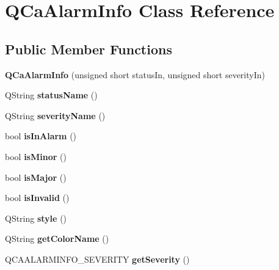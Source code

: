 \hypertarget{classQCaAlarmInfo}{
\section{QCaAlarmInfo Class Reference}
\label{classQCaAlarmInfo}
}
\subsection*{Public Member Functions}
\begin{DoxyCompactItemize}
\item 
\hypertarget{classQCaAlarmInfo_ae9661378ae726b443ddd0378819ec382}{
{\bfseries QCaAlarmInfo} (unsigned short statusIn, unsigned short severityIn)}
\label{classQCaAlarmInfo_ae9661378ae726b443ddd0378819ec382}

\item 
\hypertarget{classQCaAlarmInfo_aecc601594126abffadc2f74706353d44}{
QString {\bfseries statusName} ()}
\label{classQCaAlarmInfo_aecc601594126abffadc2f74706353d44}

\item 
\hypertarget{classQCaAlarmInfo_adee9ec5d24b85ab937b0e5f6ffaebd38}{
QString {\bfseries severityName} ()}
\label{classQCaAlarmInfo_adee9ec5d24b85ab937b0e5f6ffaebd38}

\item 
\hypertarget{classQCaAlarmInfo_aef9379084c6b7fd2ec24cfdc9dae1513}{
bool {\bfseries isInAlarm} ()}
\label{classQCaAlarmInfo_aef9379084c6b7fd2ec24cfdc9dae1513}

\item 
\hypertarget{classQCaAlarmInfo_a0724727bcb3af4d6942311e00dc1ed14}{
bool {\bfseries isMinor} ()}
\label{classQCaAlarmInfo_a0724727bcb3af4d6942311e00dc1ed14}

\item 
\hypertarget{classQCaAlarmInfo_aa6dd174ce35e8b4f0f6f848b43c81dd7}{
bool {\bfseries isMajor} ()}
\label{classQCaAlarmInfo_aa6dd174ce35e8b4f0f6f848b43c81dd7}

\item 
\hypertarget{classQCaAlarmInfo_abf75dcd9ace98f74bede7cd4b01825b0}{
bool {\bfseries isInvalid} ()}
\label{classQCaAlarmInfo_abf75dcd9ace98f74bede7cd4b01825b0}

\item 
\hypertarget{classQCaAlarmInfo_ad4e747b8adb3eaf72d5e521663f5ff60}{
QString {\bfseries style} ()}
\label{classQCaAlarmInfo_ad4e747b8adb3eaf72d5e521663f5ff60}

\item 
\hypertarget{classQCaAlarmInfo_a16e6ad7f2241364295b0a93c19185f9a}{
QString {\bfseries getColorName} ()}
\label{classQCaAlarmInfo_a16e6ad7f2241364295b0a93c19185f9a}

\item 
\hypertarget{classQCaAlarmInfo_af5441aaf2ac053d2b6b8e03dd950c9ed}{
QCAALARMINFO\_\-SEVERITY {\bfseries getSeverity} ()}
\label{classQCaAlarmInfo_af5441aaf2ac053d2b6b8e03dd950c9ed}

\end{DoxyCompactItemize}

